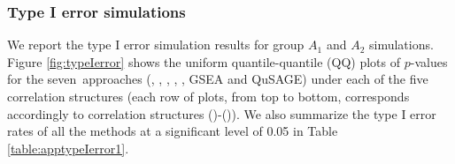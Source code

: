 	
	
	\subsubsection{Type I error simulations}\label{subsection:typeIerror}
	
	
	We report the type I error simulation results for group $A_1$ and $A_2$ simulations. Figure
	\ref{fig:typeIerror} shows the uniform quantile-quantile (QQ) plots of $p$-values for the
	seven~approaches (\OurMethod, \gent, \genr, \CMT, \CMR, GSEA and QuSAGE) under each of the five
	correlation structures (each row of plots, from top to
	bottom, corresponds accordingly to correlation structures (\aaCase)-(\fCase)). We also 
	summarize the type I error rates of all the methods at a significant level of 0.05 in 
	Table \ref{table:apptypeIerror1}.
			
